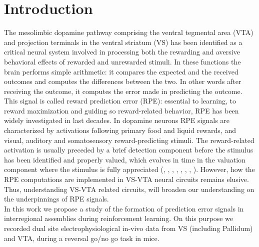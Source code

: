 \chapter{Introduction}
\label{chap:Introduction}
The mesolimbic dopamine pathway comprising the ventral tegmental area (VTA) and projection terminals in the ventral striatum (VS) has been identified as a critical neural system involved in processing both the rewarding and aversive behavioral effects of rewarded and unrewarded stimuli. In these functions the brain performs simple arithmetic: it compares the expected and the received outcomes and computes the differences between the two. In other words after receiving the outcome, it computes the error made in predicting the outcome. This signal is called reward prediction  error (RPE): essential to learning, to reward maximization and guiding so reward-related behavior, RPE has been widely investigated in last decades. In dopamine neurons RPE signals are characterized by activations following primary food and liquid rewards, and visual, auditory and somatosensory reward-predicting stimuli. The reward-related activation is usually preceded by a brief detection component before the stimulus has been identified and properly valued, which evolves in time in the valuation component where the stimulus is fully appreciated (\cite{Schultz2001}, \cite{Schultz2002}, \cite{Fiorillo}, \cite{Eshel1}, \cite{Pagnoni}, \cite{Radua}, \cite{Takahashi2016}, \cite{TianHuang}). However, how the RPE computations are implemented in VS-VTA neural circuits remains elusive.\\
Thus, understanding VS-VTA related circuits, will broaden our understanding on the underpinnings of RPE signals.\\In this work we propose a study of the formation of prediction error signals in interregional assemblies during reinforcement learning. On this purpose we recorded dual site electrophysiological in-vivo data from VS (including Pallidum) and VTA, during a reversal go/no go task in mice.\\%

